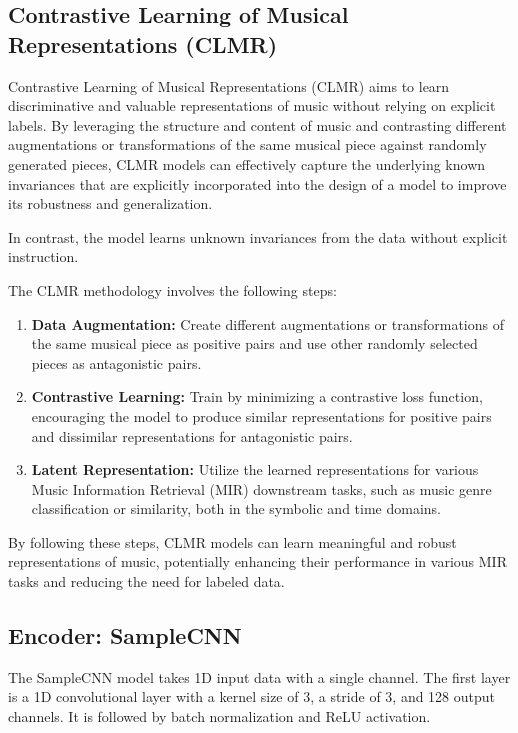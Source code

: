\subsection{Contrastive Learning of Musical Representations (CLMR)}

Contrastive Learning of Musical Representations (CLMR) \cite{CLMR2021} aims to learn discriminative and valuable representations of music without relying on explicit labels. By leveraging the structure and content of music and contrasting different augmentations or transformations of the same musical piece against randomly generated pieces, CLMR models can effectively capture the underlying known invariances that are explicitly incorporated into the design of a model to improve its robustness and generalization.

In contrast, the model learns unknown invariances from the data without explicit instruction.

The CLMR methodology involves the following steps:

\begin{enumerate}
\item \textbf{Data Augmentation:} Create different augmentations or transformations of the same musical piece as positive pairs and use other randomly selected pieces as antagonistic pairs.
\item \textbf{Contrastive Learning:} Train by minimizing a contrastive loss function, encouraging the model to produce similar representations for positive pairs and dissimilar representations for antagonistic pairs.
\item\textbf{Latent Representation:} Utilize the learned representations for various Music Information Retrieval (MIR) downstream tasks, such as music genre classification or similarity, both in the symbolic and time domains.
\end{enumerate}

By following these steps, CLMR models can learn meaningful and robust representations of music, potentially enhancing their performance in various MIR tasks and reducing the need for labeled data.

\subsection{Encoder: SampleCNN}

The SampleCNN model \cite{Lee2018SampleCNN:Classification} takes 1D input data with a single channel. The first layer is a 1D convolutional layer with a kernel size of 3, a stride of 3, and 128 output channels. It is followed by batch normalization and ReLU activation.

